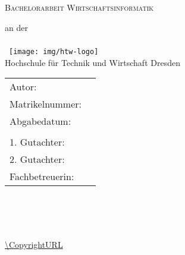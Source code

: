 \begin{titlepage}
\pagestyle{empty}

\hspace{1cm}\\
\,
\vspace{1cm}

\centering

	{
		\scshape
			\Huge \projektname{}
		\par
	}

\vspace{2cm}

{	\scshape	{\LARGE Bachelorarbeit Wirtschaftsinformatik} }

	\vspace{4mm}
	{		\small{an der}\\	}
	\hspace{1mm}\\
	\,
	\vspace{1mm}
	{\texttt{[image: img/htw-logo]}
\\%
	{	\large	Hochschule für Technik und Wirtschaft Dresden\\ }
	}

\vfill
	\vspace{2em}


\begin{tabular}{ll}%
	Autor: & \Author{} \\
	Matrikelnummer: & \AuthorID{} \\
	Abgabedatum: & \DocDate{} \\
	& \\
	1. Gutachter: & \ReviewerA{} \\
	2. Gutachter: & \ReviewerB{} \\
	Fachbetreuerin: & \SupervisorA{} \\
	
\end{tabular}

\par

\newpage

\hspace{1cm}\\
\,
\vspace{1cm}

\par

\vspace{1em}

\par



\vfill

\centering


\CopyrightIMG{}

\Copyright{}\\
\url{\CopyrightURL}

\RepoURL{}
\newpage

\end{titlepage}
